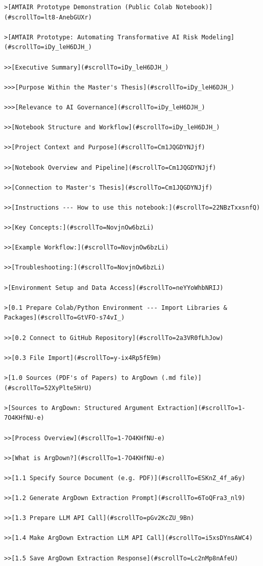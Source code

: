 \documentclass[
  11pt,
  letterpaper,
]{book}
\begin{document}
\begin{verbatim}
>[AMTAIR Prototype Demonstration (Public Colab Notebook)](#scrollTo=lt8-AnebGUXr)

>[AMTAIR Prototype: Automating Transformative AI Risk Modeling](#scrollTo=iDy_leH6DJH_)

>>[Executive Summary](#scrollTo=iDy_leH6DJH_)

>>>[Purpose Within the Master's Thesis](#scrollTo=iDy_leH6DJH_)

>>>[Relevance to AI Governance](#scrollTo=iDy_leH6DJH_)

>>[Notebook Structure and Workflow](#scrollTo=iDy_leH6DJH_)

>>[Project Context and Purpose](#scrollTo=Cm1JQGDYNJjf)

>>[Notebook Overview and Pipeline](#scrollTo=Cm1JQGDYNJjf)

>>[Connection to Master's Thesis](#scrollTo=Cm1JQGDYNJjf)

>>[Instructions --- How to use this notebook:](#scrollTo=22NBzTxxsnfQ)

>>[Key Concepts:](#scrollTo=NovjnOw6bzLi)

>>[Example Workflow:](#scrollTo=NovjnOw6bzLi)

>>[Troubleshooting:](#scrollTo=NovjnOw6bzLi)

>[Environment Setup and Data Access](#scrollTo=neYYoWhbNRIJ)

>[0.1 Prepare Colab/Python Environment --- Import Libraries & Packages](#scrollTo=GtVFO-s74vI_)

>>[0.2 Connect to GitHub Repository](#scrollTo=2a3VR0fLhJow)

>>[0.3 File Import](#scrollTo=y-ix4Rp5fE9m)

>[1.0 Sources (PDF's of Papers) to ArgDown (.md file)](#scrollTo=52XyPlte5HrU)

>[Sources to ArgDown: Structured Argument Extraction](#scrollTo=1-7O4KHfNU-e)

>>[Process Overview](#scrollTo=1-7O4KHfNU-e)

>>[What is ArgDown?](#scrollTo=1-7O4KHfNU-e)

>>[1.1 Specify Source Document (e.g. PDF)](#scrollTo=ESKnZ_4f_a6y)

>>[1.2 Generate ArgDown Extraction Prompt](#scrollTo=6ToQFra3_nl9)

>>[1.3 Prepare LLM API Call](#scrollTo=pGv2KcZU_9Bn)

>>[1.4 Make ArgDown Extraction LLM API Call](#scrollTo=i5xsDYnsAWC4)

>>[1.5 Save ArgDown Extraction Response](#scrollTo=Lc2nMp8nAfeU)


\end{verbatim}
\end{document}
